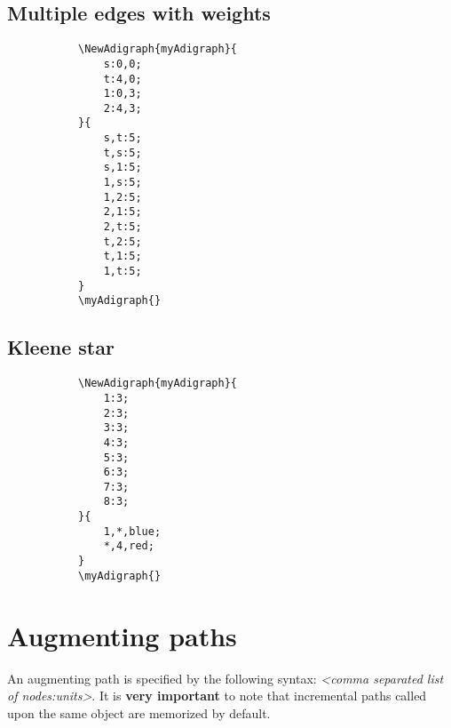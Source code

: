 \documentclass{report}
\begin{document}
\subsection{Multiple edges with weights}
\begin{figure}
	\begin{subfigure}{0.49\textwidth}
		\begin{verbatim}
\NewAdigraph{myAdigraph}{
	s:0,0;
	t:4,0;
	1:0,3;
	2:4,3;
}{
	s,t:5;
	t,s:5;
	s,1:5;
	1,s:5;
	1,2:5;
	2,1:5;
	2,t:5;
	t,2:5;
	t,1:5;
	1,t:5;
}
\myAdigraph{}
\end{verbatim}
	\end{subfigure}
	\begin{subfigure}{0.49\textwidth}
		\myAdigraph{}
	\end{subfigure}
\end{figure}

\subsection{Kleene star}
\begin{figure}
	\begin{subfigure}{0.49\textwidth}
		\begin{verbatim}
\NewAdigraph{myAdigraph}{
	1:3;
	2:3;
	3:3;
	4:3;
	5:3;
	6:3;
	7:3;
	8:3;
}{
	1,*,blue;
	*,4,red;
}
\myAdigraph{}
\end{verbatim}
	\end{subfigure}
	\begin{subfigure}{0.49\textwidth}
		\myAdigraph{}
	\end{subfigure}
\end{figure}

\section{Augmenting paths}
An augmenting path is specified by the following syntax: \textit{<comma separated list of nodes:units>}. It is \textbf{very important} to note that incremental paths called upon the same object are memorized by default.

\end{document}
